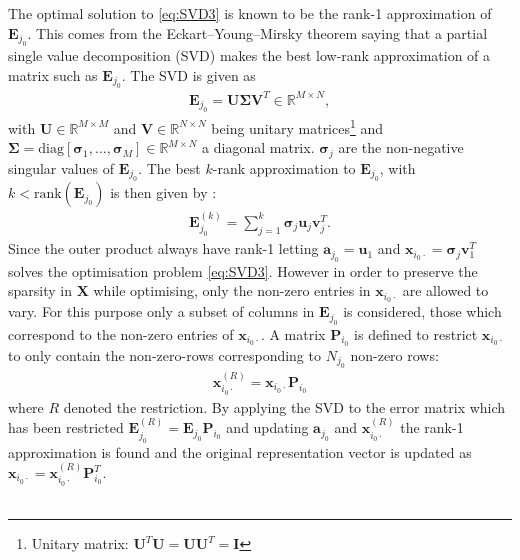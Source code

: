 The optimal solution to \eqref{eq:SVD3} is known to be the rank-1 approximation of $\textbf{E}_{j_{0}}$. This comes from the Eckart–Young–Mirsky theorem \cite{?} saying that a partial single value decomposition (SVD) makes the best low-rank approximation of a matrix such as $\textbf{E}_{j_0}$. The SVD is given as
\begin{align*}
\mathbf{E}_{j_0} = \textbf{U} \boldsymbol{\Sigma} \textbf{V}^T \in \mathbb{R}^{M\times N},
\end{align*}
with $\textbf{U} \in \mathbb{R}^{M\times M}$ and $\textbf{V} \in \mathbb{R}^{N\times N}$ being unitary matrices\footnote{Unitary matrix: $\textbf{U}^T\textbf{U}=\textbf{UU}^T=\textbf{I}$} and $\boldsymbol{\Sigma} = \text{diag}\left[\boldsymbol{\sigma}_1, \dots, \boldsymbol{\sigma}_M \right] \in \mathbb{R}^{M \times N}$ a diagonal matrix. $\boldsymbol{\sigma}_j$ are the non-negative singular values of $\textbf{E}_{j_0}$. 
The best $k$-rank approximation to $\textbf{E}_{j_0}$, with $k < \text{rank}(\textbf{E}_{j_0})$ is then given by : 
\begin{align*}
\textbf{E}_{j_{0}}^{(k)} = \sum_{j=1}^{k} \boldsymbol{\sigma}_j \textbf{u}_{j} \textbf{v}_{j}^T.
\end{align*} 
Since the outer product always have rank-1 letting $\textbf{a}_{j_0} = \textbf{u}_1$ and $\textbf{x}_{i_0 \cdot} = \boldsymbol{\sigma}_{j} \textbf{v}_{1}^T$ solves the optimisation problem \eqref{eq:SVD3}.
However in order to preserve the sparsity in $\textbf{X}$ while optimising, only the non-zero entries in $\textbf{x}_{i_0 \cdot}$ are allowed to vary. For this purpose only a subset of columns in $\textbf{E}_{j_0}$ is considered, those which correspond to the non-zero entries of $\textbf{x}_{i_0 \cdot}$. A matrix $\textbf{P}_{i_0}$ is defined to restrict $\textbf{x}_{i_0 \cdot}$ to only contain the non-zero-rows corresponding to $N_{j_0}$ non-zero rows:
\begin{align*}
\textbf{x}_{i_0 \cdot}^{(R)} = \textbf{x}_{i_0 \cdot} \textbf{P}_{i_0}
\end{align*}
where $R$ denoted the restriction. By applying the SVD to the error matrix which has been restricted $\textbf{E}_{j_0}^{(R)} = \textbf{E}_{j_0} \textbf{P}_{i_0}$ and updating $\textbf{a}_{j_0}$ and $\textbf{x}_{i_0 \cdot}^{(R)}$ the rank-1 approximation is found and the original representation vector is updated as $\textbf{x}_{i_0 \cdot} = \textbf{x}_{i_0 \cdot}^{(R)} \textbf{P}_{i_0}^{T}$.  
\\ \\
